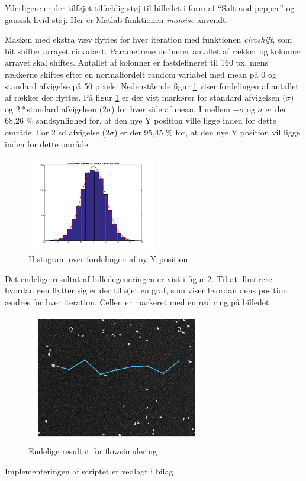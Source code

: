 Yderligere er der tilføjet tilfældig støj til billedet i form af “Salt and pepper” og gausisk hvid støj. Her er Matlab funktionen \textit{imnoise} anvendt. 

Masken med ekstra væv flyttes for hver iteration med funktionen \textit{circshift}, som bit shifter arrayet cirkulært. Parametrene definerer antallet af rækker og kolonner arrayet skal shiftes.  Antallet af kolonner er fastdefineret til 160 px, mens rækkerne skiftes efter en normalfordelt random variabel med mean på 0 og standard afvigelse på 50 pixels. Nedenstående figur \ref{fig:histfit} viser fordelingen af antallet af rækker der flyttes. På figur \ref{fig:histfit} er der vist markører for standard afvigelsen ($\sigma$) og $2*$standard afvigelsen ($2\sigma$) for hver side af mean. I mellem $-\sigma$ og $\sigma$ er der 68,26 \% sandsynlighed for, at den nye Y position ville ligge inden for dette område. For 2 sd afvigelse ($2\sigma$) er der 95,45 \% for, at den nye Y position vil ligge inden for dette område.

\begin{figure}[H]
	\centering
	\includegraphics[width=0.5\textwidth]{billeder/software/histfit.png}
	\caption{Histogram over fordelingen af ny Y position}
	\label{fig:histfit}
\end{figure}

Det endelige resultat af billedegeneringen er vist i figur \ref{fig:finalresult}. Til at illustrere hvordan øen flytter sig er der tilføjet en graf, som viser hvordan dens position ændres for hver iteration. Cellen er markeret med en rød ring på billedet.

\begin{figure}[H]
	\centering
	\includegraphics[width=0.7\textwidth]{billeder/software/final.png}
	\caption{Endelige resultat for flowsimulering}
	\label{fig:finalresult}
\end{figure}

Implementeringen af scriptet er vedlagt i bilag 